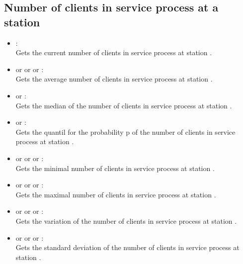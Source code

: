 \subsection{Number of clients in service process at a station}

\begin{itemize}

\item
{}:\\
Gets the current number of clients in service process at station .

\item
{} or  or  or :\\
Gets the average number of clients in service process at station .

\item
{} or :\\
Gets the median of the number of clients in service process at station .

\item
{} or :\\
Gets the quantil for the probability p of the number of clients in service process at station .

\item
{} or  or  or :\\
Gets the minimal number of clients in service process at station .

\item
{} or  or  or :\\
Gets the maximal number of clients in service process at station .

\item
{} or  or  or :\\
Gets the variation of the number of clients in service process at station .

\item
{} or  or  or :\\
Gets the standard deviation of the number of clients in service process at station .


\end{itemize}
